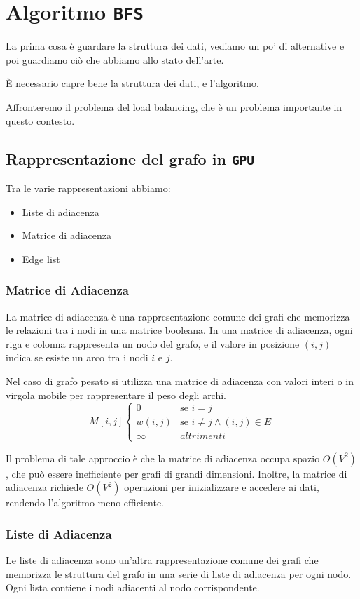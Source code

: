 
\chapter{Algoritmo \texttt{BFS}}
La prima cosa è guardare la struttura dei dati, vediamo 
un po' di alternative e poi guardiamo ciò che abbiamo 
allo stato dell'arte.

È necessario capre bene la struttura dei dati,
e l'algoritmo.

Affronteremo il problema del load balancing,
che è un problema importante in questo contesto.
\section{Rappresentazione del grafo in \texttt{GPU}}
Tra le varie rappresentazioni abbiamo:
\begin{itemize}
  \item Liste di adiacenza
  \item Matrice di adiacenza
  \item Edge list
\end{itemize}
\subsection{Matrice di Adiacenza}
La matrice di adiacenza è una rappresentazione comune dei grafi
che memorizza le relazioni tra i nodi in una matrice booleana.
In una matrice di adiacenza, ogni riga e colonna rappresenta un
nodo del grafo, e il valore in posizione \((i, j)\) indica se
esiste un arco tra i nodi \(i\) e \(j\).

Nel caso di grafo pesato si utilizza una matrice di adiacenza
con valori interi o in virgola mobile per rappresentare il peso
degli archi.
\[
  M[i,j]
  \begin{cases}
    0 & \text{se } i = j \\
    w(i,j) & \text{se } i \neq j \land (i,j) \in E \\
    \infty & altrimenti
  \end{cases}
\]

Il problema di tale approccio è che la matrice di adiacenza
occupa spazio \(O(V^2)\), che può essere inefficiente per grafi
di grandi dimensioni. Inoltre, la matrice di adiacenza richiede
\(O(V^2)\) operazioni per inizializzare e accedere ai dati,
rendendo l'algoritmo meno efficiente.
\subsection{Liste di Adiacenza}
Le liste di adiacenza sono un'altra rappresentazione comune dei grafi
che memorizza le struttura del grafo in una serie di liste di adiacenza
per ogni nodo. Ogni lista contiene i nodi adiacenti al nodo corrispondente.

